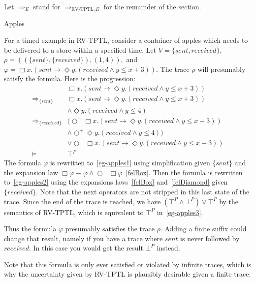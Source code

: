 \documentclass[a4paper]{article}
\newcommand{\sn}{\bigcirc^+}
\newcommand{\wn}{\bigcirc^-}
\newcommand{\rw}[1]{\Rightarrow_{#1}}
\begin{document}
Let $\rw{E}$ stand for $\rw{\text{RV-TPTL},E}$ for the remainder of the section.

\begin{eg}{Apples}

  For a timed example in RV-TPTL, consider a container of apples which needs to be delivered to a store within a specified time. Let $V=\{sent, received\}$, \(\rho=((\{sent\},\{received\}),(1,4)),\) and \(\varphi=\Box x. (sent \to \Diamond y. (received \land y \leq x + 3)).\)
  The trace $\rho$ will presumably satisfy the formula.
  Here is the progression:
  \begin{align}
    &\Box x. (sent \to \Diamond y. (received \land y \leq x + 3))\nonumber\\
    \rw{\{sent\}}
    &\Box x. (sent \to \Diamond y. (received \land y \leq x + 3))\nonumber\\
    &\land \Diamond y. (received \land y \leq 4)
    \label{eg-apples1}\\
    \rw{\{received\}}
    &(\wn \Box x. (sent \to \Diamond y. (received \land y \leq x + 3))\nonumber\\
    &\land \sn \Diamond y. (received \land y \leq 4))\nonumber\\
    &\lor \wn \Box x. (sent \to \Diamond y. (received \land y \leq x + 3))\label{eg-apples2}\\
    \vDash
    &\top^P\label{eg-apples3}
  \end{align}
  The formula $\varphi$ is rewritten to~\eqref{eg-apples1} using simplification given $\{sent\}$ and the expansion law $\Box \varphi \equiv \varphi \land \wn \Box \varphi$~\eqref{felBox}.
  Then the formula is rewritten to~\eqref{eg-apples2} using the expansions laws~\eqref{felBox} and~\eqref{felDiamond} given $\{received\}$.
  Note that the next operators are not stripped in this last state of the trace.
  Since the end of the trace is reached, we have $(\top^P \land \bot^P) \lor \top^P$ by the semantics of RV-TPTL, which is equivalent to $\top^P$ in~\eqref{eg-apples3}.

  Thus the formula $\varphi$ presumably satisfies the trace $\rho$.
  Adding a finite suffix could change that result, namely if you have a trace where $sent$ is never followed by $received$.
  In this case you would get the result $\bot^P$ instead.

  Note that this formula is only ever satisfied or violated by infinite traces, which is why the uncertainty given by RV-TPTL is plausibly desirable given a finite trace.
\end{eg}
\end{document}
